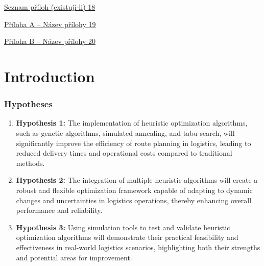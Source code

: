 \documentclass[
]{article}
\begin{document}
\protect\hyperlink{seznam-pux159uxedloh-existujuxed-li}{Seznam příloh
  (existují-li)
  \protect\hyperlink{seznam-pux159uxedloh-existujuxed-li}{18}}

\protect\hyperlink{pux159uxedloha-a-nuxe1zev-pux159uxedlohy}{Příloha A
  -- Název přílohy
  \protect\hyperlink{pux159uxedloha-a-nuxe1zev-pux159uxedlohy}{19}}

\protect\hyperlink{pux159uxedloha-b-nuxe1zev-pux159uxedlohy}{Příloha B
  -- Název přílohy
  \protect\hyperlink{pux159uxedloha-b-nuxe1zev-pux159uxedlohy}{20}}

\newpage



\hypertarget{uxfavod}{%
  \section{Introduction}\label{uxfavod}}
  


\subsubsection{Hypotheses}
\begin{enumerate}
    \item \textbf{Hypothesis 1:} The implementation of heuristic optimization algorithms, such as genetic algorithms, simulated annealing, and tabu search, will significantly improve the efficiency of route planning in logistics, leading to reduced delivery times and operational costs compared to traditional methods.
    \item \textbf{Hypothesis 2:} The integration of multiple heuristic algorithms will create a robust and flexible optimization framework capable of adapting to dynamic changes and uncertainties in logistics operations, thereby enhancing overall performance and reliability.
    \item \textbf{Hypothesis 3:} Using simulation tools to test and validate heuristic optimization algorithms will demonstrate their practical feasibility and effectiveness in real-world logistics scenarios, highlighting both their strengths and potential areas for improvement.
\end{enumerate}
\end{document}
